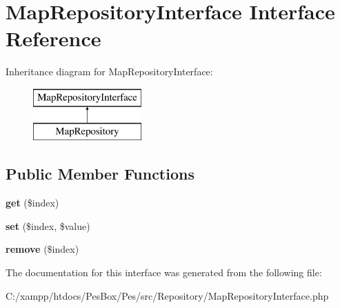 \hypertarget{interface_pes_1_1_repository_1_1_map_repository_interface}{}\section{Map\+Repository\+Interface Interface Reference}
\label{interface_pes_1_1_repository_1_1_map_repository_interface}
Inheritance diagram for Map\+Repository\+Interface\+:\begin{figure}[H]
\begin{center}
\leavevmode
\includegraphics[height=2.000000cm]{interface_pes_1_1_repository_1_1_map_repository_interface}
\end{center}
\end{figure}
\subsection*{Public Member Functions}
\begin{DoxyCompactItemize}
\item 
\mbox{\label{interface_pes_1_1_repository_1_1_map_repository_interface_a83366960f81b1627f37353da9768c264}} 
{\bfseries get} (\$index)
\item 
\mbox{\label{interface_pes_1_1_repository_1_1_map_repository_interface_a427687601a2304ad0fe3c0a371af9944}} 
{\bfseries set} (\$index, \$value)
\item 
\mbox{\label{interface_pes_1_1_repository_1_1_map_repository_interface_a2554c1a74c0099a5c59e6fa2875de396}} 
{\bfseries remove} (\$index)
\end{DoxyCompactItemize}


The documentation for this interface was generated from the following file\+:\begin{DoxyCompactItemize}
\item 
C\+:/xampp/htdocs/\+Pes\+Box/\+Pes/src/\+Repository/Map\+Repository\+Interface.\+php\end{DoxyCompactItemize}
